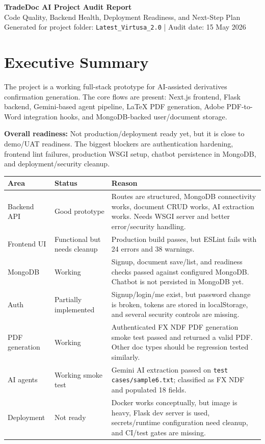 \documentclass[11pt]{article}
\begin{document}
{\Huge\bfseries TradeDoc AI Project Audit Report}\\[4pt]
{\large Code Quality, Backend Health, Deployment Readiness, and Next-Step Plan}\\[8pt]
{\color{muted}Generated for project folder: \texttt{Latest\_Virtusa\_2.0} | Audit date: 15 May 2026}

\vspace{0.5cm}
\section{Executive Summary}

The project is a working full-stack prototype for AI-assisted derivatives confirmation generation. The core flows are present: Next.js frontend, Flask backend, Gemini-based agent pipeline, LaTeX PDF generation, Adobe PDF-to-Word integration hooks, and MongoDB-backed user/document storage.

\textbf{Overall readiness:} \textcolor{amber}{Not production/deployment ready yet}, but it is close to demo/UAT readiness. The biggest blockers are authentication hardening, frontend lint failures, production WSGI setup, chatbot persistence in MongoDB, and deployment/security cleanup.

\begin{longtable}{|p{}|p{}|p{}|}
\hline
\textbf{Area} & \textbf{Status} & \textbf{Reason} \\
\hline
Backend API & Good prototype & Routes are structured, MongoDB connectivity works, document CRUD works, AI extraction works. Needs WSGI server and better error/security handling. \\
\hline
Frontend UI & Functional but needs cleanup & Production build passes, but ESLint fails with 24 errors and 38 warnings. \\
\hline
MongoDB & Working & Signup, document save/list, and readiness checks passed against configured MongoDB. Chatbot is not persisted in MongoDB yet. \\
\hline
Auth & Partially implemented & Signup/login/me exist, but password change is broken, tokens are stored in localStorage, and several security controls are missing. \\
\hline
PDF generation & Working & Authenticated FX NDF PDF generation smoke test passed and returned a valid PDF. Other doc types should be regression tested similarly. \\
\hline
AI agents & Working smoke test & Gemini AI extraction passed on \texttt{test cases/sample6.txt}; classified as FX NDF and populated 18 fields. \\
\hline
Deployment & Not ready & Docker works conceptually, but image is heavy, Flask dev server is used, secrets/runtime configuration need cleanup, and CI/test gates are missing. \\
\hline
\end{longtable}
\end{document}
